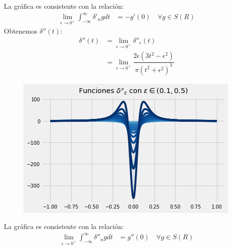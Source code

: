 \documentclass{article}
\begin{document}
\begin{tcolorbox}[breakable]
\begin{figure}[H]
    \end{figure}
    La gráfica es consistente con la relación:
    \begin{align*}
        \lim_{\epsilon \to 0^+} \int_{-\infty}^\infty \delta'_n g dt &= -g'(0)
        \quad \forall g \in S(R)
    \end{align*}
    Obtenemos $\delta''(t)$:
    \begin{align*}
        \delta''(t) 
        &= \lim_{\epsilon \to 0^+} \delta''_\epsilon(t) \\
        &= \lim_{\epsilon \to 0^+} \dfrac{2{\epsilon}\left(3t^2-{\epsilon}^2\right)}{{\pi}\left(t^2+{\epsilon}^2\right)^3} 
    \end{align*}
    \begin{figure}[H]
        \centering
        \includegraphics[scale=0.7]{images/p2_f_ddot.png}
    \end{figure}
    La gráfica es consistente con la relación:
    \begin{align*}
        \lim_{\epsilon \to 0^+} \int_{-\infty}^\infty \delta''_n g dt &= g''(0)
        \quad \forall g \in S(R)
    \end{align*}
\end{tcolorbox}
\newpage
\end{document}
